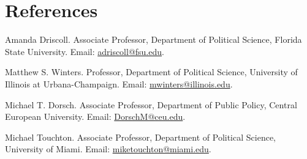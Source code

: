 \documentclass[a4paper,11.5pt]{article}
\renewenvironment{itemize}{
	\begin{list}{}{
			\setlength{\leftmargin}{1.5em}
		}
		}{
	\end{list}
}
\begin{document}
\section*{References}

\begin{itemize}
	
	\item Amanda Driscoll. Associate Professor, Department of Political Science, Florida State University. Email: \href{mailto:adriscoll@fsu.edu}{adriscoll@fsu.edu}.
	\item Matthew S. Winters. Professor, Department of Political Science, University of Illinois at Urbana-Champaign. Email: \href{mailto:mwinters@illinois.edu}{mwinters@illinois.edu}.
	\item Michael T. Dorsch. Associate Professor, Department of Public Policy, Central European University. Email: \href{mailto:DorschM@ceu.edu}{DorschM@ceu.edu}.
	\item Michael Touchton. Associate Professor, Department of Political Science, University of Miami. Email: \href{mailto:miketouchton@miami.edu}{miketouchton@miami.edu}.
\end{itemize}

	\bigskip


	
\end{document}
